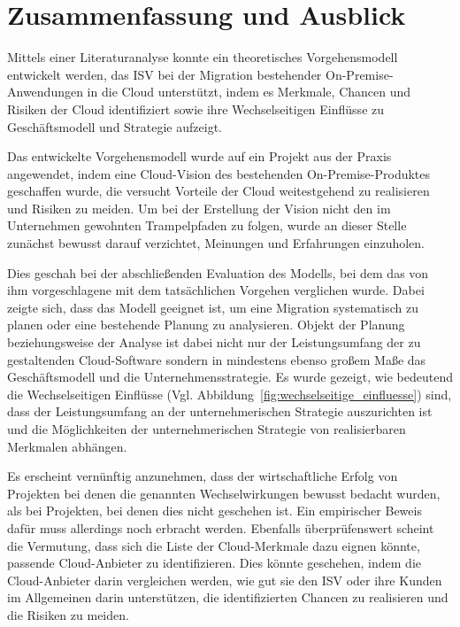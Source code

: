 \section{Zusammenfassung und Ausblick}
\label{cha:fazit}
Mittels einer Literaturanalyse konnte ein theoretisches Vorgehensmodell 
entwickelt werden, das ISV bei der Migration bestehender On-Premise-Anwendungen 
in die Cloud unterstützt, indem es Merkmale, Chancen und Risiken der Cloud 
identifiziert sowie ihre Wechselseitigen Einflüsse zu Geschäftsmodell und 
Strategie aufzeigt. 

Das entwickelte Vorgehensmodell wurde auf ein Projekt aus der Praxis 
angewendet, indem eine Cloud-Vision des bestehenden On-Premise-Produktes 
geschaffen wurde, die versucht Vorteile der Cloud weitestgehend zu realisieren 
und Risiken zu meiden. Um bei der Erstellung der Vision nicht den im 
Unternehmen gewohnten Trampelpfaden zu folgen, wurde an dieser Stelle zunächst 
bewusst darauf verzichtet, Meinungen und Erfahrungen einzuholen.

Dies geschah bei der abschließenden Evaluation des Modells, bei dem das von ihm 
vorgeschlagene mit dem tatsächlichen Vorgehen verglichen wurde. Dabei zeigte 
sich, dass das Modell geeignet ist, um eine Migration systematisch zu planen 
oder eine bestehende Planung zu analysieren. Objekt der Planung beziehungsweise 
der Analyse ist dabei nicht nur der Leistungsumfang der zu gestaltenden 
Cloud-Software sondern in mindestens ebenso großem Maße das Geschäftsmodell und 
die Unternehmensstrategie. Es wurde gezeigt, wie bedeutend die 
Wechselseitigen Einflüsse (Vgl. Abbildung~\ref{fig:wechselseitige_einfluesse}) 
sind, dass der Leistungsumfang an der unternehmerischen Strategie auszurichten 
ist und die Möglichkeiten der unternehmerischen Strategie von realisierbaren 
Merkmalen abhängen.

Es erscheint vernünftig anzunehmen, dass der wirtschaftliche Erfolg von 
Projekten bei denen die genannten Wechselwirkungen bewusst bedacht wurden, als 
bei Projekten, bei denen dies nicht geschehen ist. Ein empirischer Beweis dafür 
muss allerdings noch erbracht werden. Ebenfalls überprüfenswert scheint die 
Vermutung, dass sich die Liste der Cloud-Merkmale dazu eignen könnte, passende 
Cloud-Anbieter zu identifizieren. Dies könnte geschehen, indem die 
Cloud-Anbieter darin vergleichen werden, wie gut sie den ISV oder ihre Kunden 
im Allgemeinen darin unterstützen, die identifizierten Chancen zu realisieren 
und die Risiken zu meiden. 

